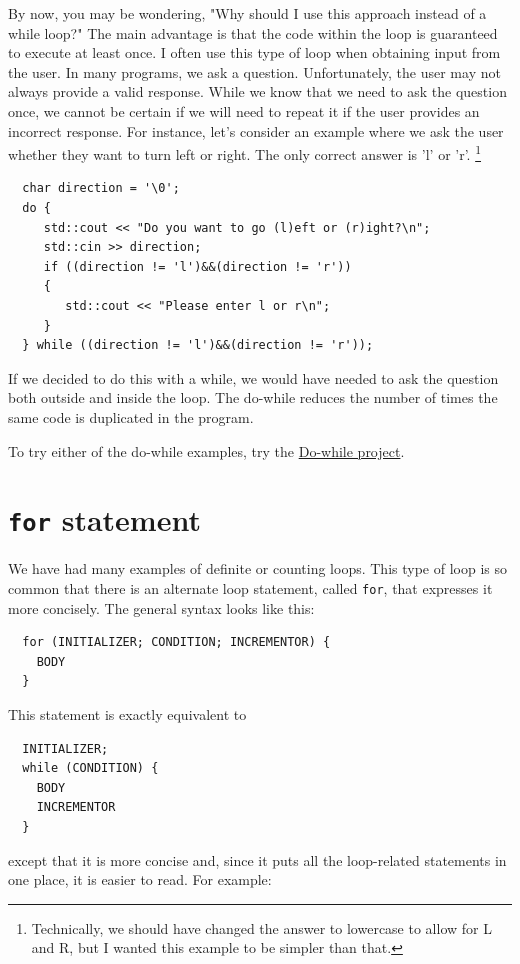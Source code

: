 By now, you may be wondering, "Why should I use this approach instead of a while loop?" The main advantage is that the code within the loop is guaranteed to execute at least once. I often use this type of loop when obtaining input from the user. In many programs, we ask a question. Unfortunately, the user may not always provide a valid response. While we know that we need to ask the question once, we cannot be certain if we will need to repeat it if the user provides an incorrect response. For instance, let's consider an example where we ask the user whether they want to turn left or right. The only correct answer is 'l' or 'r'. \footnote{Technically, we should have changed the answer to lowercase to allow for L and R,
but I wanted this example to be simpler than that.}
\begin{lstlisting}
  char direction = '\0';
  do {
     std::cout << "Do you want to go (l)eft or (r)ight?\n";
     std::cin >> direction;
     if ((direction != 'l')&&(direction != 'r'))
     {
        std::cout << "Please enter l or r\n";
     }
  } while ((direction != 'l')&&(direction != 'r'));
\end{lstlisting}
If we decided to do this with a while, we would have needed to ask 
the question both outside and inside the loop. The do-while reduces the number of times the same code is duplicated in the program.

To try either of the do-while examples, try the \href{https://replit.com/@lpatacch/dowhileexamples#dowhile.cpp}{Do-while project}.

\section{{\tt for} statement}
We have had many examples of definite or counting loops.
This type of loop is so common that there is an alternate
loop statement, called {\tt for}, that expresses it more
concisely.  The general syntax looks like this:

\begin{verbatim}
  for (INITIALIZER; CONDITION; INCREMENTOR) {
    BODY
  }
\end{verbatim}
%
This statement is exactly equivalent to

\begin{verbatim}
  INITIALIZER;
  while (CONDITION) {
    BODY
    INCREMENTOR
  }
\end{verbatim}
%
except that it is more concise and, since it puts all the
loop-related statements in one place, it is easier to read.
For example:

